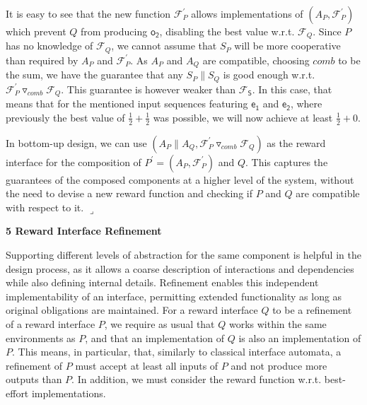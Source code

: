 \documentclass[10pt,a4paper]{article}
\begin{document}
 
 
It is easy to see that the new function $\mathcal{F}_{P}^{\prime}$ allows implementations of $(A_{P},\mathcal{F}_{P}^{\prime})$ which prevent $Q$ from producing $\mathsf{o_{2}}$, disabling the best value w.r.t. $\mathcal{F}_{Q}$. Since $P$ has no knowledge of $\mathcal{F}_{Q}$, we cannot assume that $S_{P}$ will be more cooperative than required by $A_{P}$ and $\mathcal{F}_{P}^{\prime}$. As $A_{P}$ and $A_{Q}$ are compatible, choosing $\mathit{comb}$ to be the sum, we have the guarantee that any $S_{P}\parallel S_{Q}$ is good enough w.r.t. ${{\mathcal{F}_{P}^{\prime}}\mathbin{\triangledown_{\mathit{comb}}}{\mathcal{F}_{Q}}}$. This guarantee is however weaker than $\mathcal{F}_{\mathsf{S}}$. In this case, that means that for the mentioned input sequences featuring $\mathsf{e_{1}}$ and $\mathsf{e_{2}}$, where previously the best value of $\frac{1}{2}+\frac{1}{2}$ was possible, we will now achieve at least $\frac{1}{2}+0$.\par
 
 
 
In bottom-up design, we can use $(A_{P}\parallel A_{Q},{{\mathcal{F}_{P}^{\prime}}\mathbin{\triangledown_{\mathit{comb}}}{\mathcal{F}_{Q}}})$ as the reward interface for the composition of $P^{\prime}=(A_{P},\mathcal{F}_{P}^{\prime})$ and $Q$. This captures the guarantees of the composed components at a higher level of the system, without the need to devise a new reward function and checking if $P$ and $Q$ are compatible with respect to it. $\lrcorner$\par
 
 
 


 
\par\medskip\noindent\textbf{5 Reward Interface Refinement}\par
 
 
Supporting different levels of abstraction for the same component is helpful in the design process, as it allows a coarse description of interactions and dependencies while also defining internal details. Refinement enables this independent implementability of an interface, permitting extended functionality as long as original obligations are maintained. For a reward interface $Q$ to be a refinement of a reward interface $P$, we require as usual that $Q$ works within the same environments as $P$, and that an implementation of $Q$ is also an implementation of $P$. This means, in particular, that, similarly to classical interface automata, a refinement of $P$ must accept at least all inputs of $P$ and not produce more outputs than $P$. In addition, we must consider the reward function w.r.t. best-effort implementations.\par
 
\end{document}
